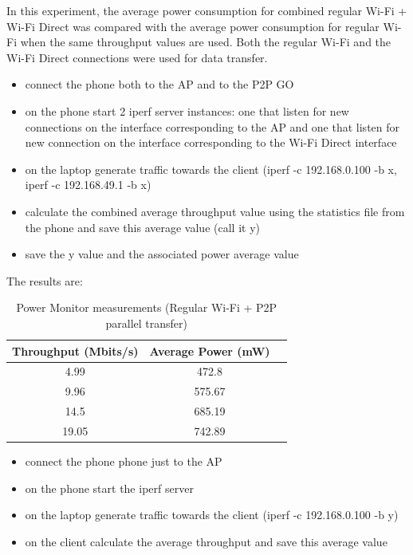 In this experiment, the average power consumption for combined regular Wi-Fi + Wi-Fi Direct was compared with the average power consumption for regular Wi-Fi when the same throughput values are used. Both the regular Wi-Fi and the Wi-Fi Direct connections were used for data transfer.

\begin{itemize}
  \item connect the phone both to the AP and to the P2P GO
  \item on the phone start 2 iperf server instances: one that listen for new connections on the interface corresponding to the AP and one that listen for new connection on the interface corresponding to the Wi-Fi Direct interface
  \item on the laptop generate traffic towards the client (iperf -c 192.168.0.100 -b x, iperf -c 192.168.49.1 -b x)
  \item calculate the combined average throughput value using the statistics file from the phone and save this average value (call it y)
  \item save the y value and the associated power average value 
\end{itemize}

The results are:

\begin{table}[h!]
  \centering
  \caption{Power Monitor measurements (Regular Wi-Fi + P2P parallel transfer)}
  \label{tab:table1}
  \begin{tabular}{ccc}
    \toprule
    Throughput (Mbits/s) & Average Power (mW) \\
    \midrule
     4.99 & 472.8 \\
     9.96 & 575.67 \\
     14.5 & 685.19\\
     19.05 & 742.89 \\
    \bottomrule
  \end{tabular}
\end{table}

\begin{itemize}
  \item connect the phone phone just to the AP
  \item on the phone start the iperf server
  \item on the laptop generate traffic towards the client (iperf -c 192.168.0.100 -b y)
  \item on the client calculate the average throughput and save this average value
\end{itemize}

